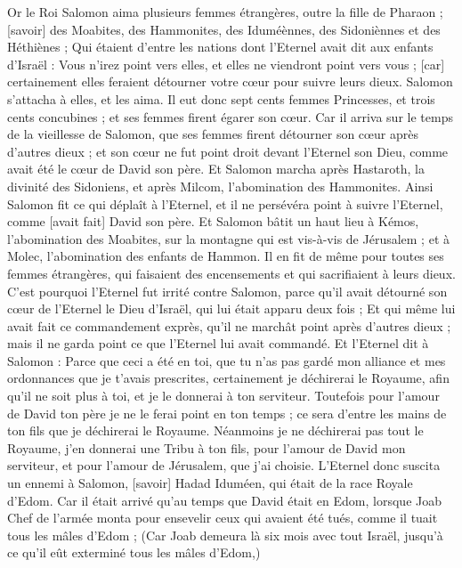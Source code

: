 \begin{multicols}{2}
\VerseOne{}Or le Roi Salomon aima plusieurs femmes étrangères, outre la fille de Pharaon ; [savoir] des Moabites, des Hammonites, des Iduméènnes, des Sidoniènnes et des Héthiènes ;
Qui étaient d'entre les nations dont l'Eternel avait dit aux enfants d'Israël : Vous n'irez point vers elles, et elles ne viendront point vers vous ; [car] certainement elles feraient détourner votre cœur pour suivre leurs dieux. Salomon s'attacha à elles, et les aima.
Il eut donc sept cents femmes Princesses, et trois cents concubines ; et ses femmes firent égarer son cœur.
Car il arriva sur le temps de la vieillesse de Salomon, que ses femmes firent détourner son cœur après d'autres dieux ; et son cœur ne fut point droit devant l'Eternel son Dieu, comme avait été le cœur de David son père.
Et Salomon marcha après Hastaroth, la divinité des Sidoniens, et après Milcom, l'abomination des Hammonites.
Ainsi Salomon fit ce qui déplaît à l'Eternel, et il ne persévéra point à suivre l'Eternel, comme [avait fait] David son père.
Et Salomon bâtit un haut lieu à Kémos, l'abomination des Moabites, sur la montagne qui est vis-à-vis de Jérusalem ; et à Molec, l'abomination des enfants de Hammon.
Il en fit de même pour toutes ses femmes étrangères, qui faisaient des encensements et qui sacrifiaient à leurs dieux.
C'est pourquoi l'Eternel fut irrité contre Salomon, parce qu'il avait détourné son cœur de l'Eternel le Dieu d'Israël, qui lui était apparu deux fois ;
Et qui même lui avait fait ce commandement exprès, qu'il ne marchât point après d'autres dieux ; mais il ne garda point ce que l'Eternel lui avait commandé.
Et l'Eternel dit à Salomon : Parce que ceci a été en toi, que tu n'as pas gardé mon alliance et mes ordonnances que je t'avais prescrites, certainement je déchirerai le Royaume, afin qu'il ne soit plus à toi, et je le donnerai à ton serviteur.
Toutefois pour l'amour de David ton père je ne le ferai point en ton temps ; ce sera d'entre les mains de ton fils que je déchirerai le Royaume.
Néanmoins je ne déchirerai pas tout le Royaume, j'en donnerai une Tribu à ton fils, pour l'amour de David mon serviteur, et pour l'amour de Jérusalem, que j'ai choisie.
L'Eternel donc suscita un ennemi à Salomon, [savoir] Hadad Iduméen, qui était de la race Royale d'Edom.
Car il était arrivé qu'au temps que David était en Edom, lorsque Joab Chef de l'armée monta pour ensevelir ceux qui avaient été tués, comme il tuait tous les mâles d'Edom ;
(Car Joab demeura là six mois avec tout Israël, jusqu'à ce qu'il eût exterminé tous les mâles d'Edom,)

\end{multicols}
